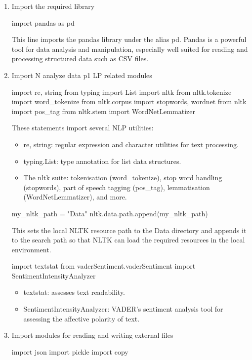 \documentclass[12pt]{article}
\numberwithin{figure}{section}  %
\begin{document}
\begin{enumerate}
\item Import the required library
\begin{python}
import pandas as pd
\end{python}
This line imports the pandas library under the alias pd. Pandas is a powerful tool for data analysis and manipulation, especially well suited for reading and processing structured data such as CSV files.
\item Import N analyze data p1 LP related modules
\begin{python}
import re, string
from typing import List
import nltk
from nltk.tokenize import word_tokenize
from nltk.corpus import stopwords, wordnet
from nltk import pos_tag
from nltk.stem import WordNetLemmatizer

\end{python}

These statements import several NLP utilities:
\begin{itemize}
\item re, string: regular expression and character utilities for text processing.
\item typing.List: type annotation for list data structures.
\item The nltk suite: tokenisation (word\_tokenize), stop word handling (stopwords), part of speech tagging (pos\_tag), lemmatisation (WordNetLemmatizer), and more.
\end{itemize}
\begin{python}
my_nltk_path = "Data"
nltk.data.path.append(my_nltk_path)

\end{python}
This sets the local NLTK resource path to the Data directory and appends it to the search path so that NLTK can load the required resources in the local environment.
\begin{python}
import textstat
from vaderSentiment.vaderSentiment import SentimentIntensityAnalyzer

\end{python}
\begin{itemize}
\item textstat: assesses text readability.
\item SentimentIntensityAnalyzer: VADER’s sentiment analysis tool for assessing the affective polarity of text.
\end{itemize}
\item Import modules for reading and writing external files
\begin{python}
import json
import pickle
import copy


\end{python}
\end{enumerate}
\end{document}
